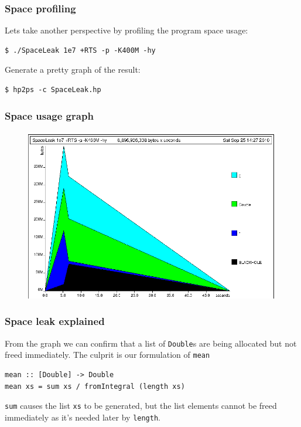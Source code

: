 \documentclass{beamer}
\begin{document}
\begin{frame}[fragile]
  \frametitle{Space profiling}

  Lets take another perspective by profiling the program space usage:
  \begin{verbatim}
$ ./SpaceLeak 1e7 +RTS -p -K400M -hy
  \end{verbatim}

  Generate a pretty graph of the result:
  \begin{verbatim}
$ hp2ps -c SpaceLeak.hp
  \end{verbatim}
\end{frame}

\begin{frame}
  \frametitle{Space usage graph}

  \begin{figure}
    \includegraphics[scale=1.0]{diagrams/SpaceLeak.eps}
  \end{figure}
\end{frame}

\begin{frame}[fragile]
  \frametitle{Space leak explained}

  From the graph we can confirm that a list of \lstinline!Double!s are
  being allocated but not freed immediately.  The culprit is our
  formulation of \lstinline!mean!

  \begin{lstlisting}
mean :: [Double] -> Double
mean xs = sum xs / fromIntegral (length xs)
  \end{lstlisting}

  \lstinline!sum! causes the list \lstinline!xs! to be generated, but
  the list elements cannot be freed immediately as it's needed later
  by \lstinline!length!.
\end{frame}
\end{document}
